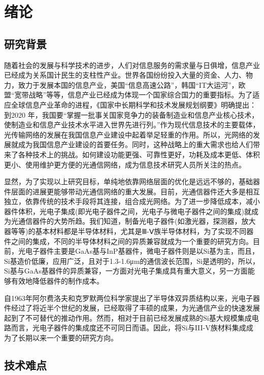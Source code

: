 % 

\chapter{绪论}

\section{研究背景}


随着社会的发展与科学技术的进步，人们对信息服务的需求量与日俱增，信息产业已经成为关系国计民生的支柱性产业。世界各国纷纷投入大量的资金、人力、物力，致力于发展本国的信息产业，美国“信息高速公路”，韩国“IT大运河”，欧盟“宽带战略”等等，信息产业已经成为体现一个国家综合国力的重要指标。为了适应全球信息产业革命的进程，《国家中长期科学和技术发展规划纲要》明确提出：到2020 年，我国要“掌握一批事关国家竞争力的装备制造业和信息产业核心技术，使制造业和信息产业技术水平进入世界先进行列。”作为现代信息技术的主要载体，光传输网络的发展在我国信息产业建设中起着举足轻重的作用。所以，光网络的发展就成为我国信息产业建设的首要任务。同时，这种战略上的重大需求也给人们带来了各种技术上的挑战。如何建设功能更强、可靠性更好，功耗及成本更低、体积更小、使用维护更方便的光通信网络，成为信息技术研究人员所关注的热点。

显然，为了实现以上研究目标，单纯地依靠网络层面的优化是远远不够的，基础器件层面的进展更能够带动光通信网络的重大发展。目前，光通信器件还大多是相互独立，依靠传统的技术手段将其连接，组合成光网络。为了进一步降低成本，减小器件体积，光电子集成(即光电子器件之间，光电子与微电子器件之间的集成)就成为光通信器件的大势所趋。我们知道，制备光电子器件(如激光器，探测器，放大器等等)的基本材料都是半导体材料，尤其是Ⅲ-Ⅴ族半导体材料，为了实现不同器件之间的集成，不同的半导体材料之间的异质兼容就成为一个重要的研究方向。目前，光电子器件主要是GaAs基与InP基器件，微电子器件则是以Si基为主，而且，Si基造价低廉，应用广泛，且对于1.3-1.6μm的通信波长范围，Si是透明的，所以， Si基与GaAs基器件的异质兼容，一方面对光电子集成具有重大意义，另一方面能够有效地降低器件的制作成本。

自1963年阿尔费洛夫和克罗默两位科学家提出了半导体双异质结构以来，光电子器件经过了将近半个世纪的发展，已经取得了丰硕的成果，为光通信产业的快速发展起到了不可替代的推动作用。然而，相对于目前已经发展成熟的Si基大规模集成电路而言，光电子器件的集成度还不可同日而语。因此，将Si与III-V族材料集成成为了长期以来一个重要的研究方向。


\section{技术难点}

